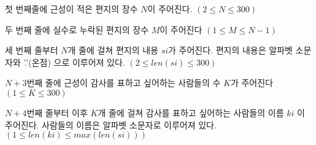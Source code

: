 첫 번째줄에 근성이 적은 편지의 장수 $N$이 주어진다. $(2 \le N \le 300)$

두 번째 줄에 실수로 누락된 편지의 장수 $M$이 주어진다 $(1 \le M \le N - 1)$

세 번째 줄부터 $N$개 줄에 걸쳐 편지의 내용 $si$가 주어진다. 편지의 내용은 알파벳 소문자와 '.'(온점) 으로 이루어져 있다. $(2 \le len(si)\le 300)$ 


$N + 3$번째 줄에 근성이 감사를 표하고 싶어하는 사람들의 수 $K$가 주어진다 $(1 \le K \le 300 )$

$N + 4$번째 줄부터 이후 $K$개 줄에 걸쳐 감사를 표하고 싶어하는 사람들의 이름 $ki$ 이 주어진다. 
사람들의 이름은 알파벳 소문자로 이루어져 있다. $(1 \le len(ki) \le max(len(si)) )$  

